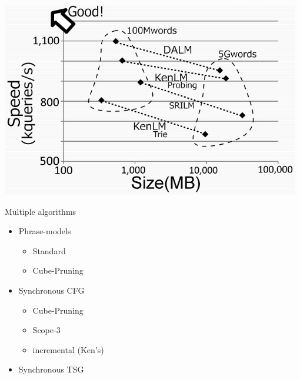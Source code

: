 \documentclass[landscape]{uedslides2C}
\begin{document}
\begin{center} 
\includegraphics[scale=1.0]{DALM.png}\vspace{-20mm}
\end{center}



Multiple algorithms
\begin{itemize}
  \item Phrase-models
    \begin{itemize}
    \item Standard
    \item Cube-Pruning
    \end{itemize}
  \item Synchronous CFG
    \begin{itemize}
    \item Cube-Pruning
    \item Scope-3
    \item incremental (Ken's)
    \end{itemize}
  \item Synchronous TSG
  
\end{itemize}


\end{document}
